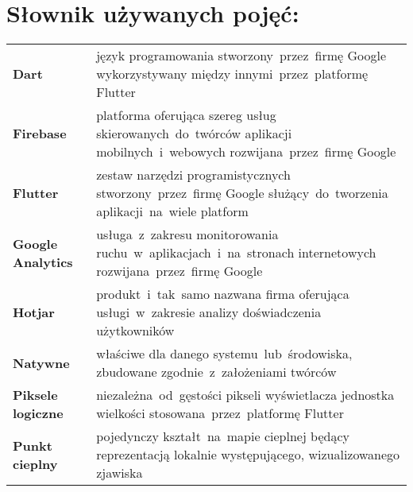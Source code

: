 \section*{Słownik używanych pojęć:}

\begin{table}[H]
\begin{tabularx}{\textwidth}{ m{2.8cm} X }
	\textbf{Dart} \dotfill & język programowania stworzony~przez~firmę Google wykorzystywany między innymi~przez~platformę Flutter \\
	\textbf{Firebase} \dotfill & platforma oferująca szereg usług skierowanych~do~twórców aplikacji mobilnych~i~webowych rozwijana~przez~firmę Google \\
	\textbf{Flutter} \dotfill & zestaw narzędzi programistycznych stworzony~przez~firmę Google służący~do~tworzenia aplikacji~na~wiele platform \\
	\textbf{Google Analytics} \dotfill & usługa~z~zakresu monitorowania ruchu~w~aplikacjach~i~na~stronach internetowych rozwijana~przez~firmę Google \\
	\textbf{Hotjar} \dotfill & produkt~i~tak~samo nazwana firma oferująca usługi~w~zakresie analizy doświadczenia użytkowników \\
	\textbf{Natywne} \dotfill & właściwe dla danego systemu~lub~środowiska, zbudowane zgodnie~z~założeniami twórców \\
	\textbf{Piksele logiczne} \dotfill & niezależna~od~gęstości pikseli wyświetlacza jednostka wielkości stosowana~przez~platformę Flutter \\
	\textbf{Punkt cieplny} \dotfill & pojedynczy kształt~na~mapie cieplnej będący reprezentacją lokalnie występującego, wizualizowanego zjawiska \\
\end{tabularx}
\end{table}
